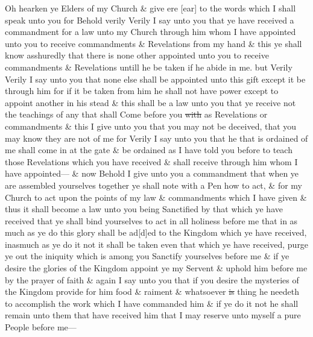 				Oh hearken ye Elders of my Church \& give ere [ear] to the words which I shall speak unto you for Behold verily Verily I say unto you that ye have received a commandment for a law unto my Church through him whom I have appointed unto you to receive commandments \& Revelations from my hand \& this ye shall know asshuredly that there is none other appointed unto you to receive commandments \& Revelations untill he be taken if he abide in me. but Verily Verily I say unto you that none else shall be appointed unto this gift except it be through him for if it be taken from him he shall not have power except to appoint another in his stead \& this shall be a law unto you that ye receive not the teachings of any that shall Come before you \sout{with} as Revelations or commandments \& this I give unto you that you may not be deceived, that you may know they are not of me for Verily I say unto you that he that is ordained of me shall come in at the gate \& be ordained as I have told you before to teach those Revelations which you have received \& shall receive through him whom I have appointed--- \& now Behold I give unto you a commandment that when ye are assembled yourselves together ye shall note with a Pen how to act, \& for my Church to act upon the points of my law \& commandments which I have given \& thus it shall become a law unto you being Sanctified by that which ye have received that ye shall bind yourselves to act in all holiness before me that in as much as ye do this glory shall be ad[d]ed to the Kingdom which ye have received, inasmuch as ye do it not it shall be taken even that which ye have received, purge ye out the iniquity which is among you Sanctify yourselves before me \& if ye desire the glories of the Kingdom appoint ye my Servent \& uphold him before me by the prayer of faith \& again I say unto you that if you desire the mysteries of the Kingdom provide for him food \& raiment \& whatsoever \sout{is} thing he needeth to accomplish the work which I have commanded him \& if ye do it not he shall remain unto them that have received him that I may reserve unto myself a pure People before me---
				

